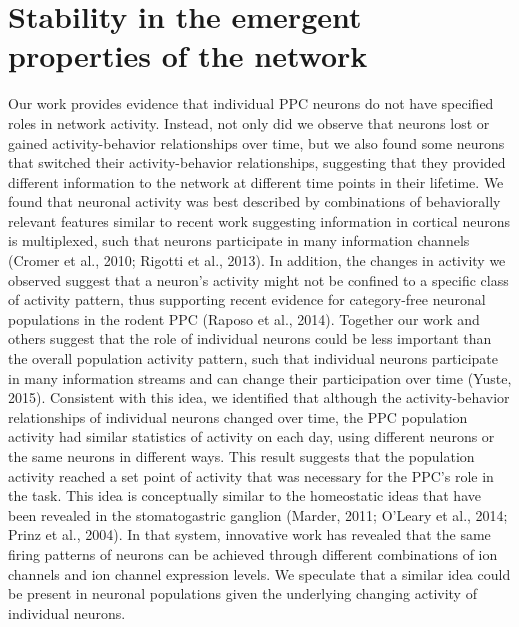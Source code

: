 \section{Stability in the emergent properties of the network} \label{discussion:emergent_prop}

Our work provides evidence that individual PPC neurons do not have specified roles in network activity. Instead, not only did we observe that neurons lost or gained activity-behavior relationships over time, but we also found some neurons that switched their activity-behavior relationships, suggesting that they provided different information to the network at different time points in their lifetime. We found that neuronal activity was best described by combinations of behaviorally relevant features similar to recent work suggesting information in cortical neurons is multiplexed, such that neurons participate in many information channels (Cromer et al., 2010; Rigotti et al., 2013). In addition, the changes in activity we observed suggest that a neuron’s activity might not be confined to a specific class of activity pattern, thus supporting recent evidence for category-free neuronal populations in the rodent PPC (Raposo et al., 2014). Together our work and others suggest that the role of individual neurons could be less important than the overall population activity pattern, such that individual neurons participate in many information streams and can change their participation over time (Yuste, 2015). Consistent with this idea, we identified that although the activity-behavior relationships of individual neurons changed over time, the PPC population activity had similar statistics of activity on each day, using different neurons or the same neurons in different ways. This result suggests that the population activity reached a set point of activity that was necessary for the PPC’s role in the task. This idea is conceptually similar to the homeostatic ideas that have been revealed in the stomatogastric ganglion (Marder, 2011; O’Leary et al., 2014; Prinz et al., 2004). In that system, innovative work has revealed that the same firing patterns of neurons can be achieved through different combinations of ion channels and ion channel expression levels. We speculate that a similar idea could be present in neuronal populations given the underlying changing activity of individual neurons.